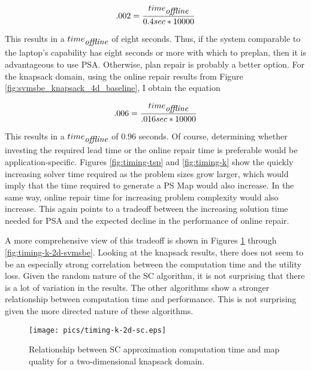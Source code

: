 \begin{equation*}
.002 = \frac{time_{\mbox{\itshape offline}}}{0.4sec * 10000}
\end{equation*}

This results in a $time_{\mbox{\itshape offline}}$ of eight seconds.  Thus, if the system comparable to the laptop's capability has eight seconds or more with which to preplan, then it is advantageous to use PSA.  Otherwise, plan repair is probably a better option.  For the knapsack domain, using the online repair results from Figure \ref{fig:svmsbe_knapsack_4d_baseline}, I obtain the equation

\begin{equation*}
.006 = \frac{time_{\mbox{\itshape offline}}}{.016sec * 10000}
\end{equation*}

This results in a $time_{\mbox{\itshape offline}}$ of 0.96 seconds.  Of course, determining whether investing the required lead time or the online repair time is preferable would be application-specific.  Figures \ref{fig:timing-tsp} and \ref{fig:timing-k} show the quickly increasing solver time required as the problem sizes grow larger, which would imply that the time required to generate a PS Map would also increase.  In the same way, online repair time for increasing problem complexity would also increase.  This again points to a tradeoff between the increasing solution time needed for PSA and the expected decline in the performance of online repair.

A more comprehensive view of this tradeoff is shown in Figures \ref{fig:timing-k-2d-sc} through \ref{fig:timing-k-2d-svmsbe}.  Looking at the knapsack results, there does not seem to be an especially strong correlation between the computation time and the utility loss.  Given the random nature of the SC algorithm, it is not surprising that there is a lot of variation in the results.  The other algorithms show a stronger relationship between computation time and performance.  This is not surprising given the more directed nature of these algorithms.  






\begin{figure}
\begin{center}
\texttt{[image: pics/timing-k-2d-sc.eps]}
\caption{Relationship between SC approximation computation time and map quality for a two-dimensional knapsack domain.}
\label{fig:timing-k-2d-sc}
\end{center}
\end{figure}


